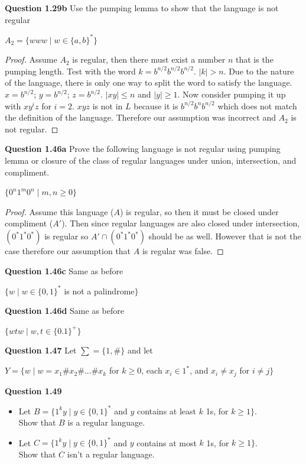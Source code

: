 \documentclass{article}
\begin{document}
    \textbf{Question 1.29b} Use the pumping lemma to show that the language is not regular
        \begin{center}
            $A_2=\{www\mid w\in \{a,b\}^*\}$
        \end{center}
        \begin{proof}
            Assume $A_2$ is regular, then there must exist a number $n$ that is the pumping length. Test with the word $k = b^{n/2}b^{n/2}b^{n/2}$. $|k|>n$. Due to the nature of the language, there is only one way to split the word to satisfy the language. $x = b^{n/2}$; $y=b^{n/2}$; $z= b^{n/2}$. $|xy|\leq n$ and $|y|\geq 1$. Now consider pumping it up with $xy^iz$ for $i=2$. $xyz$ is not in $L$ because it is $b^{n/2}b^{n}b^{n/2}$ which does not match the definition of the language. Therefore our assumption was incorrect and $A_2$ is not regular.
        \end{proof}
    \textbf{Question 1.46a} Prove the following language is not regular using pumping lemma or closure of the class of regular languages under union, intersection, and compliment.
        \begin{center}
            $\{0^n1^m0^n\mid m,n \geq 0\}$
        \end{center}
        \begin{proof}
            Assume this language ($A$) is regular, so then it must be closed under compliment ($A'$). Then since regular languages are also closed under intersection, $(0^*1^*0^*)$ is regular so $A'\cap (0^*1^*0^*)$ should be as well. However that is not the case therefore our assumption that $A$ is regular was false.
        \end{proof}
    \textbf{Question 1.46c} Same as before
        \begin{center}
            $\{w\mid w\in \{0,1\}^* $ is not a palindrome$ \}$
        \end{center}
    \textbf{Question 1.46d} Same as before
        \begin{center}
            $\{wtw \mid w,t \in \{0.1\}^+ \}$
        \end{center}
    \textbf{Question 1.47} Let $\sum = \{1,\#\}$ and let 
        \begin{center}
            $Y=\{w\mid w=x_1\#x_2\#...\#x_k $ for $ k \geq 0 $, each $ x_i\in 1^* $, and $ x_i\not= x_j $ for $ i\not= j \}$
        \end{center}
    \textbf{Question 1.49}
        \begin{itemize}
            \item Let $B= \{1^ky\mid y\in \{0,1\}^*$ and $y$ contains at least $k$ 1s, for $k\geq 1\}$.\\
                  Show that $B$ is a regular language.
            \item Let $C= \{1^k y\mid y\in \{0,1\}^* $ and $y$ contains at most $k$ 1s, for $k\geq 1\}$.\\
                  Show that $C$ isn't a regular language.
        \end{itemize}
\end{document}
